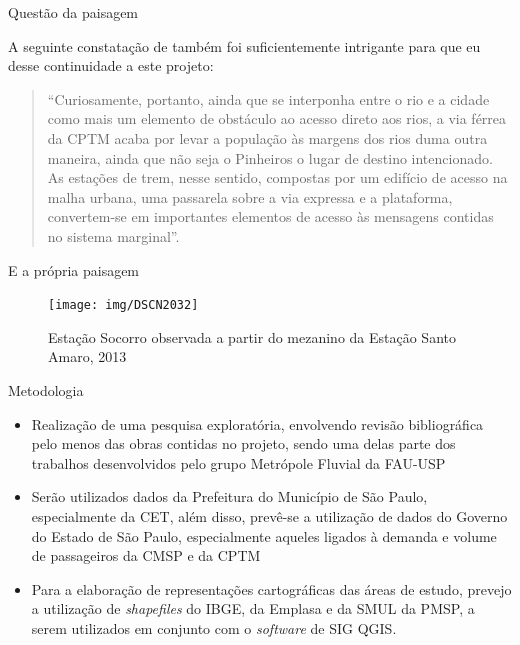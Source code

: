 \documentclass[spectratio=43, portuguese]{beamer}
\begin{document}

\begin{frame}{Questão da paisagem}
	
A seguinte constatação de  também foi suficientemente intrigante para que eu desse continuidade a este projeto:

\begin{quote}
	``Curiosamente, portanto, ainda que se interponha entre o rio e a cidade como mais um elemento de obstáculo ao acesso direto aos rios, a via férrea da CPTM acaba por levar a população às margens dos rios duma outra maneira, ainda que não seja o Pinheiros o lugar de destino intencionado. As estações de trem, nesse sentido, compostas por um edifício de acesso na malha urbana, uma passarela sobre a via expressa e a plataforma, convertem-se em importantes elementos de acesso às mensagens contidas no sistema marginal''.
\end{quote}

\end{frame}


\begin{frame}{E a própria paisagem}

	\begin{figure}
		\centering
		\caption{Estação Socorro observada a partir do mezanino da Estação Santo Amaro, 2013}
		\label{fig:trilhos_cjd}
		\texttt{[image: img/DSCN2032]}
	\end{figure}
	
\end{frame}


\begin{frame}{Metodologia}
	
	\begin{itemize}
		\item Realização de uma pesquisa exploratória, envolvendo revisão bibliográfica pelo menos das obras contidas no projeto, sendo uma delas parte dos trabalhos desenvolvidos pelo grupo Metrópole Fluvial da FAU-USP
		\item Serão utilizados dados da Prefeitura do Município de São Paulo, especialmente da CET, além disso, prevê-se a utilização de dados do Governo do Estado de São Paulo, especialmente aqueles ligados à demanda e volume de passageiros da CMSP e da CPTM
		\item Para a elaboração de representações cartográficas das áreas de estudo, prevejo a utilização de \textit{shapefiles} do IBGE, da Emplasa e da SMUL da PMSP, a serem utilizados em conjunto com o \textit{software} de SIG QGIS.
	\end{itemize}
	
\end{frame}
\end{document}
